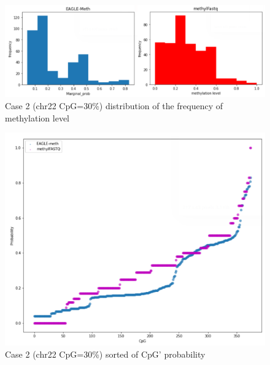 \documentclass{PHlab-thesis}
\begin{document}
\begin{figure}[h]
  \centering
  \includegraphics[scale=0.8]{figures/CHR22_30.PNG}
  \caption{Case 2 (chr22 CpG=30\%) distribution of the frequency of methylation level}
  \label{fig:case_2_1} 
\end{figure}
\begin{figure}[h]
  \centering
  \includegraphics[scale=0.8]{figures/CHR22_30_2.PNG}
  \caption{Case 2 (chr22 CpG=30\%) sorted of CpG' probability}
  \label{fig:case_2_2} 
\end{figure}
\end{document}
